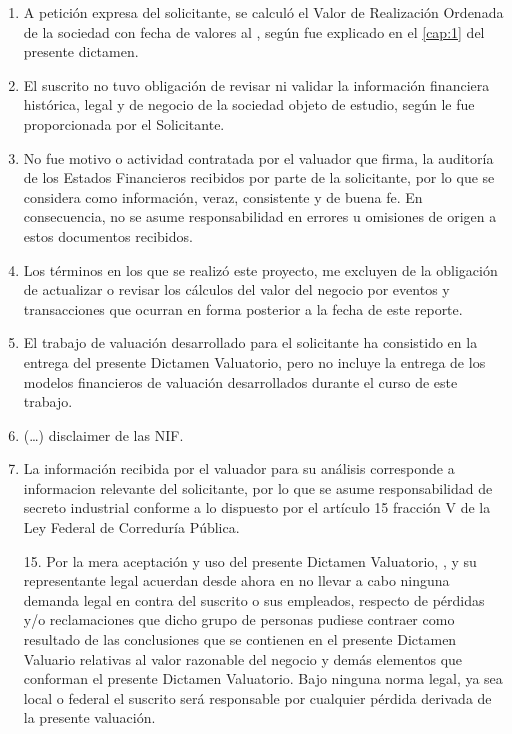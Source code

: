 \begin{enumerate}
\begin{enumerate}
\begin{enumerate}
		\item A petici\'on expresa del solicitante, se calcul\'o el Valor de Realizaci\'on Ordenada de la sociedad con fecha de valores al \textcolor{principal}{\fechaValores}, seg\'un fue explicado en el \autoref{cap:1} del presente dictamen.

		\item El suscrito no tuvo obligaci\'on de revisar ni validar la informaci\'on financiera hist\'orica, legal y de negocio de la sociedad objeto de estudio, seg\'un le fue proporcionada por el Solicitante. 

		\item No fue motivo o actividad contratada por el valuador que firma, la auditor\'ia de los Estados Financieros recibidos por parte de la solicitante, por lo que se considera como informaci\'on, veraz, consistente y de buena fe. En consecuencia, no se asume responsabilidad en errores u omisiones de origen a estos documentos recibidos.

		\item Los t\'erminos en los que se realiz\'o este proyecto, me excluyen de la obligaci\'on de actualizar o revisar los c\'alculos del valor del negocio por eventos y transacciones que ocurran en forma posterior a la fecha de este reporte.

		\item El trabajo de valuaci\'on desarrollado para el solicitante ha consistido en la entrega del presente Dictamen Valuatorio, pero no incluye la entrega de los modelos financieros de valuaci\'on desarrollados durante el curso de este trabajo.

		\item (…) disclaimer de las NIF.

		\item La informaci\'on recibida por el valuador para su an\'alisis corresponde a informaci\¡on relevante del solicitante, por lo que se asume responsabilidad de secreto industrial conforme a lo dispuesto por el art\'iculo 15 fracci\'on V de la Ley Federal de Correduría P\'ublica.

15.	Por la mera aceptación y uso del presente Dictamen Valuatorio, \textcolor{principal}{\empresaSolicitante}, y su representante legal acuerdan desde ahora en no llevar a cabo ninguna demanda legal en contra del suscrito o sus empleados, respecto de p\'erdidas y/o reclamaciones que dicho grupo de personas pudiese contraer como resultado de las conclusiones que se contienen en el presente Dictamen Valuario relativas al valor razonable del negocio y dem\'as elementos que conforman el presente Dictamen Valuatorio. Bajo ninguna norma legal, ya sea local o federal el suscrito ser\'a responsable por cualquier p\'erdida derivada de la presente valuaci\'on.


\end{enumerate}
\end{enumerate}
\end{enumerate}
